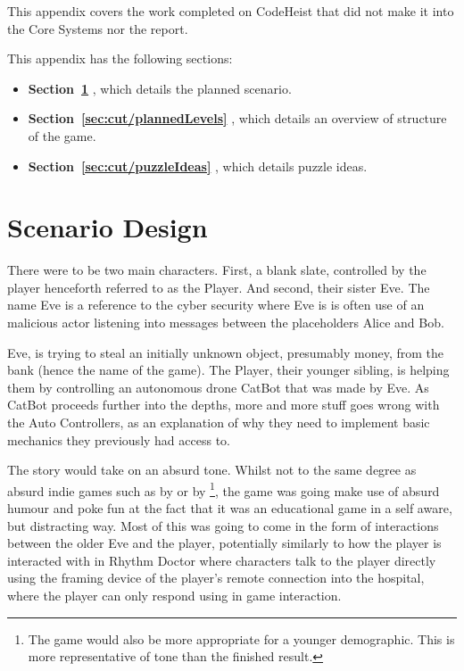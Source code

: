 
This appendix covers the work completed on CodeHeist that did not make it into the Core Systems nor the report.

This appendix has the following sections:

\begin{itemize}
    \item \textbf{Section~\ref{sec:cut/scenarioDesign}} , which details the planned scenario.
    \item \textbf{Section~\ref{sec:cut/plannedLevels}} , which details an overview of structure of the game.
    \item \textbf{Section~\ref{sec:cut/puzzleIdeas}} , which details puzzle ideas.
\end{itemize}

\section{Scenario Design}\label{sec:cut/scenarioDesign}

There were to be two main characters. First, a blank slate, controlled by the player henceforth referred to as the Player. And second, their sister Eve. The name Eve is a reference to the cyber security where Eve is is often use of an malicious actor listening into messages between the placeholders Alice and Bob.

Eve, is trying to steal an initially unknown object, presumably money, from the bank (hence the name of the game). The Player, their younger sibling, is helping them by controlling an autonomous drone CatBot that was made by Eve. As CatBot proceeds further into the depths, more and more stuff goes wrong with the Auto Controllers, as an explanation of why they need to implement basic mechanics they previously had access to.

The story would take on an absurd tone. Whilst not to the same degree as absurd indie games such as  by \citet{TurnitTaxEvation} or  by \citet{ThankGoodnessURHere}\footnote{The game would also be more appropriate for a younger demographic. This is more representative of tone than the finished result.}, the game was going make use of absurd humour and poke fun at the fact that it was an educational game in a self aware, but distracting way. Most of this was going to come in the form of interactions between the older Eve and the player, potentially similarly to how the player is interacted with in Rhythm Doctor \cite{RhythmDoctor} where characters talk to the player directly using the framing device of the player's remote connection into the hospital, where the player can only respond using in game interaction.

